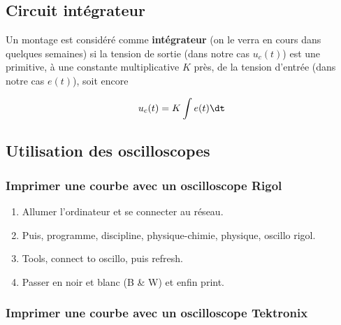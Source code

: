\documentclass[a4paper, 11pt, final, garamond]{book}
\begin{document}
\subsection{Circuit intégrateur}

Un montage est considéré comme \textbf{intégrateur} (on le verra en cours dans
quelques semaines) si la tension de sortie (dans notre cas $u_{c}(t)$) est une
primitive, à une constante multiplicative $K$ près, de la tension d'entrée (dans
notre cas $e(t)$), soit encore

\[u_{c}(t) = K \int e(t) \dt\]

\subsection{Utilisation des oscilloscopes}

\subsubsection{Imprimer une courbe avec un oscilloscope Rigol}

\begin{enumerate}
    \item Allumer l'ordinateur et se connecter au réseau.
    \item Puis, programme, discipline, physique-chimie, physique, oscillo rigol.
    \item Tools, connect to oscillo, puis refresh.
    \item Passer en noir et blanc (B \& W) et enfin print.
\end{enumerate}

\subsubsection{Imprimer une courbe avec un oscilloscope Tektronix}
\end{document}
